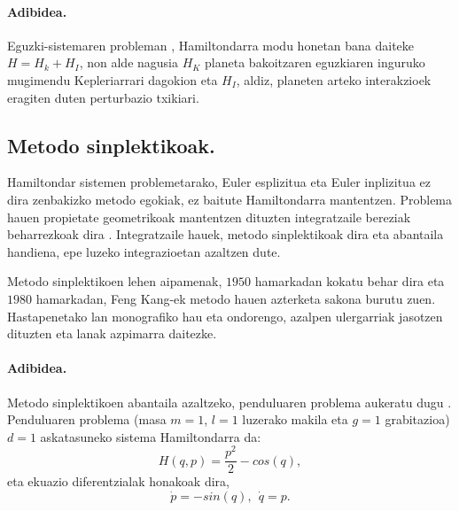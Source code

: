 \paragraph*{Adibidea.} Eguzki-sistemaren probleman \cite{Saha1992,Wisdom2006}, Hamiltondarra modu honetan bana daiteke $H=H_k+H_I$, non alde nagusia $H_K$ planeta bakoitzaren eguzkiaren inguruko mugimendu Kepleriarrari dagokion eta $H_I$, aldiz, planeten arteko interakzioek eragiten duten perturbazio txikiari.   

\subsection{Metodo sinplektikoak.}

Hamiltondar sistemen problemetarako, Euler esplizitua eta Euler inplizitua ez dira zenbakizko metodo egokiak, ez baitute Hamiltondarra mantentzen. Problema hauen propietate geometrikoak mantentzen dituzten integratzaile bereziak beharrezkoak dira \cite{JMSanz-Serna1994,SSerna2015b}. Integratzaile hauek, metodo sinplektikoak dira eta abantaila handiena, epe luzeko integrazioetan azaltzen dute.

Metodo sinplektikoen lehen aipamenak, $1950$ hamarkadan kokatu behar dira eta $1980$ hamarkadan, Feng Kang-ek metodo hauen azterketa sakona burutu zuen. Hastapenetako lan monografiko hau \cite{JMSanz-Serna1994} eta ondorengo, azalpen ulergarriak jasotzen dituzten \cite{Hairer2006} eta  \cite{Leimkuhler2004} lanak azpimarra daitezke.    


\paragraph*{Adibidea.} Metodo sinplektikoen abantaila azaltzeko, penduluaren problema aukeratu dugu \cite{Hairer2015a}. Penduluaren problema (masa $m=1$, $l=1$ luzerako makila eta $g=1$ grabitazioa) $d=1$ askatasuneko sistema Hamiltondarra da:
\begin{equation}
H(q,p)= \frac{p^2}{2}- cos (q),
\end{equation}
%
eta ekuazio diferentzialak honakoak dira,
\begin{equation}
\label{eq:pendulua}
\dot{p}= -sin (q), \ \ \dot{q}=p.
\end{equation}


